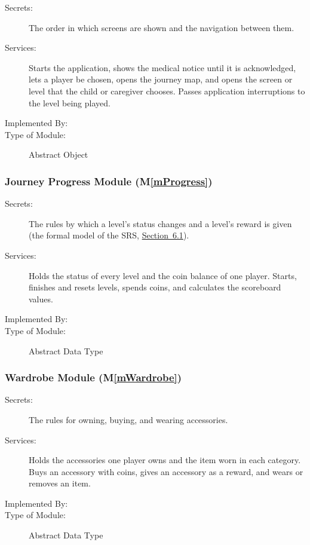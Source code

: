 \documentclass[10pt, titlepage]{article}
\newcommand{\srsurl}{https://team-hindsight.github.io/ophthamology-game/SRS/SRS.pdf}
\newcommand{\srsitemref}[2]{\href{\srsurl\#nameddest=#1}{#2}}
\newcommand{\mplainref}[1]{M\ref*{#1}}
\begin{document}
\begin{description}
\item[Secrets:] The order in which screens are shown and the navigation
  between them.
\item[Services:] Starts the application, shows the medical notice until it is
  acknowledged, lets a player be chosen, opens the journey map, and opens the
  screen or level that the child or caregiver chooses. Passes application
  interruptions to the level being played.
\item[Implemented By:] \progname{}
\item[Type of Module:] Abstract Object
\end{description}

\subsubsection{Journey Progress Module (\mplainref{mProgress})}\label{md:mProgress}

\begin{description}
\item[Secrets:] The rules by which a level's status changes and a level's
  reward is given (the formal model of the SRS,
  \srsitemref{sec_FormalSpec}{Section~6.1}).
\item[Services:] Holds the status of every level and the coin balance of one
  player. Starts, finishes and resets levels, spends coins, and calculates the
  scoreboard values.
\item[Implemented By:] \progname{}
\item[Type of Module:] Abstract Data Type
\end{description}

\subsubsection{Wardrobe Module (\mplainref{mWardrobe})}\label{md:mWardrobe}

\begin{description}
\item[Secrets:] The rules for owning, buying, and wearing accessories.
\item[Services:] Holds the accessories one player owns and the item worn in
  each category. Buys an accessory with coins, gives an accessory as a reward,
  and wears or removes an item.
\item[Implemented By:] \progname{}
\item[Type of Module:] Abstract Data Type
\end{description}
\end{document}
